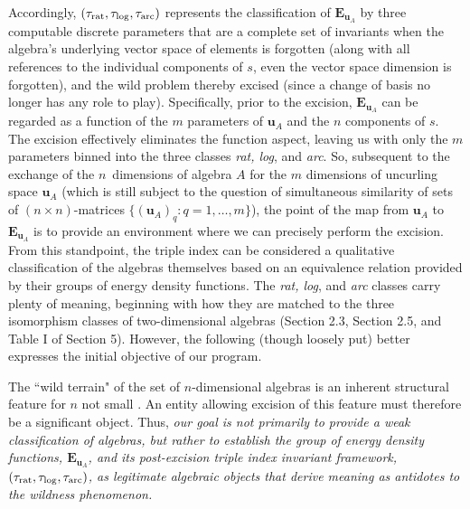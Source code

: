\documentclass{amsart}
\numberwithin{equation}{section}
\theoremstyle{definition}
\numberwithin{theorem}{section}
\begin{document}
 Accordingly,  $(\tau_{\rm rat},\tau_{\rm log},\tau_{\rm arc})$ represents the classification of $\mathbf{E}_{\mathbf{u}_A}$ by three computable discrete parameters that are a complete set of invariants when the algebra's underlying vector space of elements is forgotten (along with all references to the individual components of $s$, even the vector space dimension is forgotten), and the wild problem thereby excised (since a change of basis no longer has any role to play).   Specifically, prior to the excision,
$\mathbf{E}_{\mathbf{u}_A}$ can be regarded as a function of the $m$ parameters of $\mathbf{u}_A$ and the $n$ components of $s$. 
The excision effectively eliminates the function aspect, leaving us with only the $m$ parameters binned into the three classes {\it rat, log}, and {\it arc}.
 So, subsequent to the exchange of the \mbox{$n$ dimensions} of algebra $A$ for the $m$ dimensions of uncurling space $\mathbf{u}_A$ (which is still subject to the question of simultaneous similarity of sets of $(n\times n)$-matrices  $\{ (\mathbf{u}_A)_q:q=1,\dots,m\}$), the point of the map from $\mathbf{u}_A$ to $\mathbf{E}_{\mathbf{u}_A}$ is to provide an environment where we can precisely perform the excision.  From this standpoint, the triple index can be considered a qualitative classification of the algebras themselves based on an equivalence relation provided by their groups of energy density functions.  The {\it rat, log}, and {\it arc} classes carry plenty of meaning, beginning with how they are matched to the three isomorphism classes of two-dimensional algebras (Section 2.3, Section 2.5, and Table I of Section 5).  
      However, the following (though loosely put)  better expresses the initial objective of our program.
 
 The ``wild terrain" of the set of $n$-dimensional algebras is an inherent structural feature for $n$ not small \cite{poonen:2008}.  An entity allowing excision of this feature must therefore be a significant object.  Thus, {\it our goal is not primarily to provide a weak classification of algebras, but rather to establish the group of energy density functions, $\mathbf{E}_{\mathbf{u}_A}$, and its post-excision triple index invariant framework, $(\tau_{\rm rat},\tau_{\rm log},\tau_{\rm arc})$, as legitimate algebraic objects that derive meaning as antidotes to the wildness phenomenon.}
\end{document}
